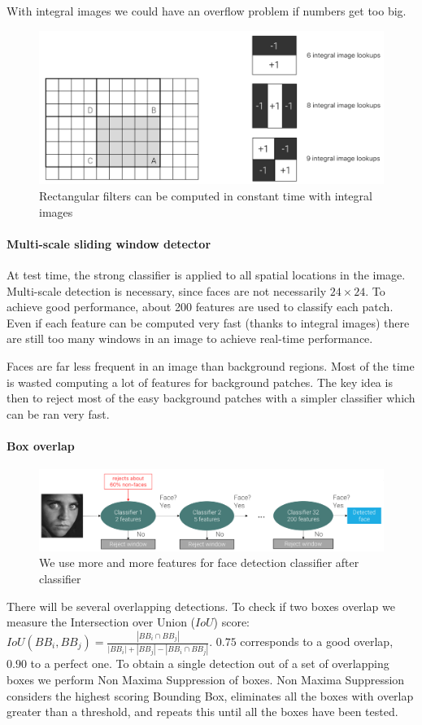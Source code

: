 With integral images we could have an overflow problem if numbers get too big.

\begin{figure}[htbp]
  \centering
  \includegraphics[width=0.6\linewidth]{./img/integral_filters.png}
  \caption{Rectangular filters can be computed in constant time with integral images}
\end{figure}

\paragraph{Multi-scale sliding window detector}
At test time, the strong classifier is applied to all spatial locations in the image.
Multi-scale detection is necessary, since faces are not necessarily $24\times 24$.
To achieve good performance, about 200 features are used to classify each patch.
Even if each feature can be computed very fast (thanks to integral images) there are still too many windows in an image to achieve real-time performance.

Faces are far less frequent in an image than background regions.
Most of the time is wasted computing a lot of features for background patches.
The key idea is then to reject most of the easy background patches with a simpler classifier which can be ran very fast.

\paragraph{Box overlap}

\begin{figure}[htbp]
  \centering
  \includegraphics[width=0.6\linewidth]{./img/cascade_classifier.png}
  \caption{We use more and more features for face detection classifier after classifier}
\end{figure}

There will be several overlapping detections.
To check if two boxes overlap we measure the Intersection over Union ($IoU$) score: $IoU(BB_i, BB_j) = \frac{|BB_i \cap BB_j|}{|BB_i| + |BB_j| - |BB_i \cap BB_j|}$. $0.75$ corresponds to a good overlap, $0.90$ to a perfect one.
To obtain a single detection out of a set of overlapping boxes we perform Non Maxima Suppression of boxes.
Non Maxima Suppression considers the highest scoring Bounding Box, eliminates all the boxes with overlap greater than a threshold, and repeats this until all the boxes have been tested.

